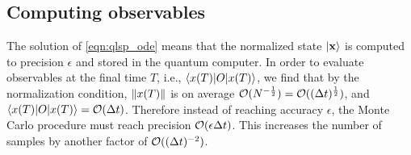 % 

\subsection{Computing observables}

The solution of \cref{eqn:qlsp_ode} means that the normalized state $\ket{\mathbf{x}}$ is computed to precision $\epsilon$ and stored in the quantum computer.
In order to evaluate observables at the final time $T$, i.e., $\braket{x(T)|O|x(T)}$, we find that by the normalization condition, $\left\lVert x(T)\right\rVert$ is on average $\mathcal{O}(N^{-\frac12})=\mathcal{O}((\Delta t)^{\frac12})$, and $\braket{x(T)|O|x(T)}=\mathcal{O}(\Delta t)$. 
Therefore instead of reaching accuracy $\epsilon$, the Monte Carlo procedure must reach precision $\mathcal{O}(\epsilon\Delta t)$. 
This increases the number of samples by another factor of $\mathcal{O}((\Delta t)^{-2})$.

